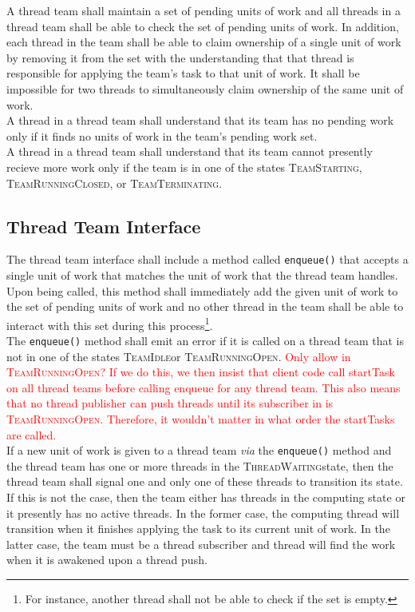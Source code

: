 \documentclass{article}
\newcommand{\TeamStarting}      {\textsc{TeamStarting}}
\newcommand{\TeamIdle}          {\textsc{TeamIdle}}
\newcommand{\TeamRunningOpen}   {\textsc{TeamRunningOpen}}
\newcommand{\TeamRunningClosed} {\textsc{TeamRunningClosed}}
\newcommand{\TeamTerminating}   {\textsc{TeamTerminating}}
\newcommand{\ThreadWaiting}     {\textsc{ThreadWaiting}}
\begin{document}
A thread team shall maintain a set of pending units of work and all threads in a
thread team shall be able to check the set of pending units of work.  In
addition, each thread in the team shall be able to claim ownership of a single
unit of work by removing it from the set with the understanding that that thread
is responsible for applying the team's task to that unit of work.  It shall be
impossible for two threads to simultaneously claim ownership of the same unit of
work.\\

A thread in a thread team shall understand that its team has no pending work
only if it finds no units of work in the team's pending work set.\\

A thread in a thread team shall understand that its team cannot presently
recieve more work only if the team is in one of the states \TeamStarting,
\TeamRunningClosed, or \TeamTerminating.

\subsection{Thread Team Interface}

The thread team interface shall include a method called \texttt{enqueue()} that
accepts a single unit of work that matches the unit of work that the thread team
handles.  Upon being called, this method shall immediately add the given unit of
work to the set of pending units of work and no other thread in the team shall
be able to interact with this set during this process\footnote{For instance,
another thread shall not be able to check if the set is empty.}.\\

The \texttt{enqueue()} method shall emit an error if it is called on a thread
team that is not in one of the states \TeamIdle or \TeamRunningOpen.
\textcolor{red}{Only allow in \TeamRunningOpen?  If we do this, we then insist
that client code call startTask on all thread teams before calling enqueue for
any thread team.  This also means that no thread publisher can push threads
until its subscriber in is \TeamRunningOpen.  Therefore, it wouldn't matter in
what order the startTasks are called.}\\

If a new unit of work is given to a thread team \textit{via} the
\texttt{enqueue()} method and the thread team has one or more threads in the
\ThreadWaiting state, then the thread team shall signal one and only one of
these threads to transition its state.  If this is not the case, then the team
either has threads in the computing state or it presently has no active threads.
In the former case, the computing thread will transition when it finishes
applying the task to its current unit of work.  In the latter case, the team
must be a thread subscriber and thread will find the work when it is awakened
upon a thread push.\\
\end{document}
